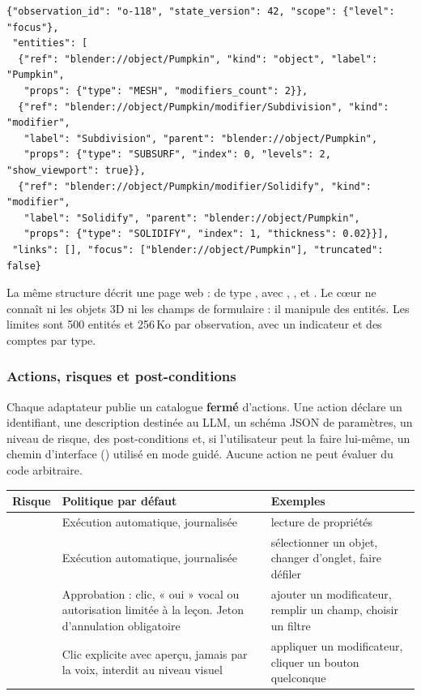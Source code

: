 \begin{lstlisting}[language={}]
{"observation_id": "o-118", "state_version": 42, "scope": {"level": "focus"},
 "entities": [
  {"ref": "blender://object/Pumpkin", "kind": "object", "label": "Pumpkin",
   "props": {"type": "MESH", "modifiers_count": 2}},
  {"ref": "blender://object/Pumpkin/modifier/Subdivision", "kind": "modifier",
   "label": "Subdivision", "parent": "blender://object/Pumpkin",
   "props": {"type": "SUBSURF", "index": 0, "levels": 2, "show_viewport": true}},
  {"ref": "blender://object/Pumpkin/modifier/Solidify", "kind": "modifier",
   "label": "Solidify", "parent": "blender://object/Pumpkin",
   "props": {"type": "SOLIDIFY", "index": 1, "thickness": 0.02}}],
 "links": [], "focus": ["blender://object/Pumpkin"], "truncated": false}
\end{lstlisting}

La même structure décrit une page web :  de type , avec , ,  et . Le cœur ne connaît ni les objets 3D ni les champs de formulaire : il manipule des entités. Les limites sont 500 entités et 256\,Ko par observation, avec un indicateur  et des comptes par type.

\subsubsection{Actions, risques et post-conditions}

Chaque adaptateur publie un catalogue \textbf{fermé} d'actions. Une action déclare un identifiant, une description destinée au LLM, un schéma JSON de paramètres, un niveau de risque, des post-conditions et, si l'utilisateur peut la faire lui-même, un chemin d'interface () utilisé en mode guidé. Aucune action ne peut évaluer du code arbitraire.

\begin{xltabular}{\textwidth}{@{}L{2.3cm}Y L{4.3cm}@{}}
\toprule
\textbf{Risque} & \textbf{Politique par défaut} & \textbf{Exemples} \\
\midrule
{} & Exécution automatique, journalisée & lecture de propriétés \\
 & Exécution automatique, journalisée & sélectionner un objet, changer d'onglet, faire défiler \\
 & Approbation : clic, « oui » vocal ou autorisation limitée à la leçon. Jeton d'annulation obligatoire & ajouter un modificateur, remplir un champ, choisir un filtre \\
 & Clic explicite avec aperçu, jamais par la voix, interdit au niveau visuel & appliquer un modificateur, cliquer un bouton quelconque \\
\bottomrule
\end{xltabular}

